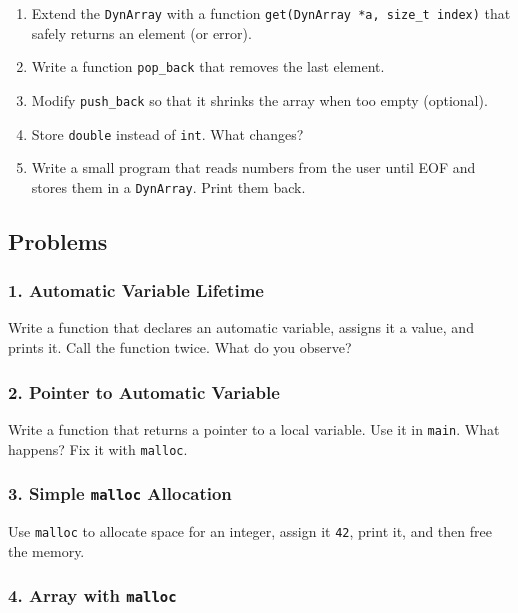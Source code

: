 \documentclass[
  letterpaper,
  DIV=11,
  numbers=noendperiod]{scrreprt}
\providecommand{\tightlist}{%
  \setlength{\itemsep}{0pt}\setlength{\parskip}{0pt}}
\begin{document}
\begin{enumerate}
\def\labelenumi{\arabic{enumi}.}
\tightlist
\item
  Extend the \texttt{DynArray} with a function
  \texttt{get(DynArray\ *a,\ size\_t\ index)} that safely returns an
  element (or error).
\item
  Write a function \texttt{pop\_back} that removes the last element.
\item
  Modify \texttt{push\_back} so that it shrinks the array when too empty
  (optional).
\item
  Store \texttt{double} instead of \texttt{int}. What changes?
\item
  Write a small program that reads numbers from the user until EOF and
  stores them in a \texttt{DynArray}. Print them back.
\end{enumerate}

\subsection{Problems}\label{problems-7}

\subsubsection{1. Automatic Variable
Lifetime}\label{automatic-variable-lifetime}

Write a function that declares an automatic variable, assigns it a
value, and prints it. Call the function twice. What do you observe?

\subsubsection{2. Pointer to Automatic
Variable}\label{pointer-to-automatic-variable}

Write a function that returns a pointer to a local variable. Use it in
\texttt{main}. What happens? Fix it with \texttt{malloc}.

\subsubsection{\texorpdfstring{3. Simple \texttt{malloc}
Allocation}{3. Simple malloc Allocation}}\label{simple-malloc-allocation}

Use \texttt{malloc} to allocate space for an integer, assign it
\texttt{42}, print it, and then free the memory.

\subsubsection{\texorpdfstring{4. Array with
\texttt{malloc}}{4. Array with malloc}}\label{array-with-malloc}
\end{document}
